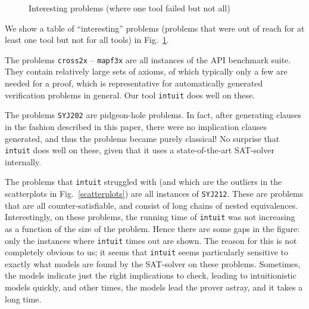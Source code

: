 \documentclass{llncs}
\begin{document}
\begin{figure}[td]
\centering

\caption{
Interesting problems (where one tool failed but not all)
\label{fig:interesting}
}
\end{figure}

We show a table of ``interesting'' problems (problems that were out of reach for at least one tool but not for all tools) in Fig.\ \ref{fig:interesting}.

The problems {\tt cross2x} -- {\tt mapf3x} are all instances of the API benchmark suite. They contain relatively large sets of axioms, of which typically only a few are needed for a proof, which is representative for automatically generated verification problems in general. Our tool {\tt intuit} does well on these.

The problems {\tt SYJ202} are pidgeon-hole problems. In fact, after generating clauses in the fashion described in this paper, there were no implication clauses generated, and thus the problems became purely classical! No surprise that {\tt intuit} does well on these, given that it uses a state-of-the-art SAT-solver internally.

The problems that {\tt intuit} struggled with (and which are the outliers in the scatterplots in Fig.\ \ref{scatterplots}) are all instances of {\tt SYJ212}. These are problems that are all counter-satisfiable, and consist of long chains of nested equivalences.
Interestingly, on these problems, the running time of {\tt intuit} was not
increasing as a function of the size of the problem. Hence there are some gaps in the figure: only the instances where {\tt intuit} times out are shown. The reason for this is not completely obvious to us; it seems that {\tt intuit} seems particularly sensitive to exactly what models are found by the SAT-solver on these problems. Sometimes, the models indicate just the right implications to check, leading to intuitionistic models quickly, and other times, the models lead the prover astray, and it takes a long time. 


\end{document}
